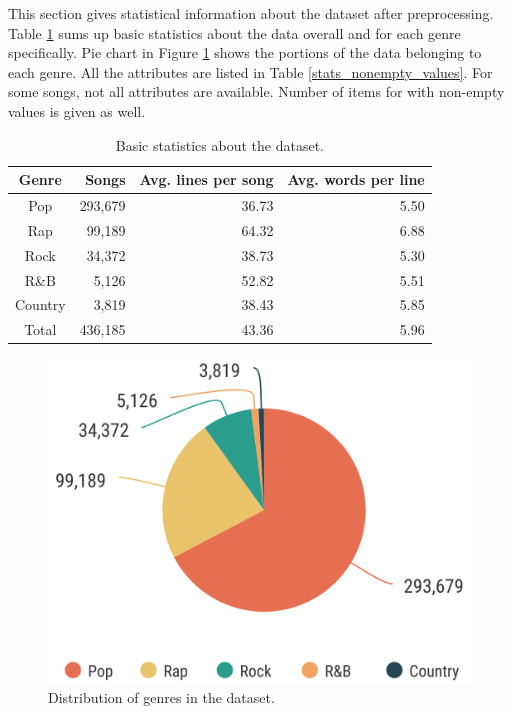 This section gives statistical information about the dataset after preprocessing. Table \ref{basic_stats} sums up basic statistics about the data overall and for each genre specifically. Pie chart in Figure \ref{piechart_genres} shows the portions of the data belonging to each genre. All the attributes are listed in Table \ref{stats_nonempty_values}. For some songs, not all attributes are available. Number of items for with non-empty values is given as well.
\begin{table}[h!]
	\centering
	\begin{tabular}{c | r r r} 
		Genre & Songs & Avg. lines per song & Avg. words per line \\ 
		\midrule \midrule
		Pop & 293,679& 36.73 & 5.50\\
		Rap & 99,189 & 64.32 & 6.88 \\
		Rock & 34,372 & 38.73 & 5.30 \\
		R\&B & 5,126 & 52.82 & 5.51 \\
		Country & 3,819 & 38.43 & 5.85 \\
		\midrule
		Total & 436,185 & 43.36 & 5.96 \\
	\end{tabular}
	\caption{Basic statistics about the dataset.}
	\label{basic_stats}
\end{table}



\begin{figure}[h]\centering
	\includegraphics[scale=0.25]{../img/piechart_genres.png}
	\caption{Distribution of genres in the dataset.}\label{piechart_genres}
\end{figure}



